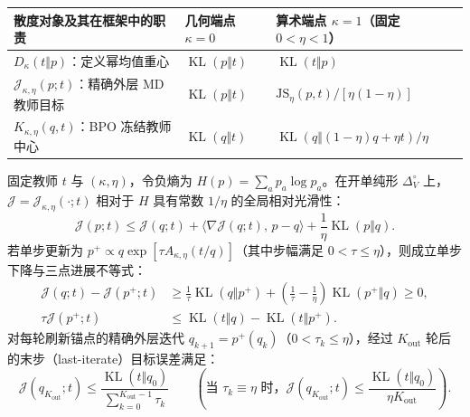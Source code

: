 \documentclass[lang=cn,scheme=chinese,openany]{elegantbook}
\newcommand{\KL}{\operatorname{KL}}
\begin{document}
\begin{center}
\small
\begin{tabular}{lll}
\toprule
散度对象及其在框架中的职责 & 几何端点 $\kappa=0$ & 算术端点 $\kappa=1$（固定 $0<\eta<1$）\\
\midrule
$D_\kappa(t\Vert p)$：定义幂均值重心 & $\KL(p\Vert t)$ & $\KL(t\Vert p)$\\
$\mathcal J_{\kappa,\eta}(p;t)$：精确外层 MD 教师目标 & $\KL(p\Vert t)$ & $\mathrm{JS}_\eta(p,t)/[\eta(1-\eta)]$\\
$K_{\kappa,\eta}(q,t)$：BPO 冻结教师中心 & $\KL(q\Vert t)$ & $\KL(q\Vert(1-\eta)q+\eta t)/\eta$\\
\bottomrule
\end{tabular}
\end{center}

\begin{theorem}
\label{thm:power-md-relative-smoothness}
固定教师 $t$ 与 $(\kappa,\eta)$，令负熵为 $H(p)=\sum_a p_a\log p_a$。在开单纯形 $\Delta_V^\circ$ 上，$\mathcal J=\mathcal J_{\kappa,\eta}(\cdot;t)$ 相对于 $H$ 具有常数 $1/\eta$ 的全局相对光滑性：
\begin{equation}
 \mathcal J(p;t)\le\mathcal J(q;t)+\bigl\langle\nabla\mathcal J(q;t),\,p-q\bigr\rangle
       +\frac1\eta\KL(p\Vert q).
 \label{eq:power-md-relative-smoothness}
\end{equation}
若单步更新为 $p^+\propto q\exp[\tau A_{\kappa,\eta}(t/q)]$（其中步幅满足 $0<\tau\le\eta$），则成立单步下降与三点进展不等式：
\begin{align}
 \mathcal J(q;t)-\mathcal J(p^+;t)
 &\ge\frac1\tau\KL(q\Vert p^+)
  +\left(\frac1\tau-\frac1\eta\right)\KL(p^+\Vert q)\ge 0,\\
 \tau\mathcal J(p^+;t)
 &\le\KL(t\Vert q)-\KL(t\Vert p^+).
 \label{eq:power-md-single-step-progress}
\end{align}
对每轮刷新锚点的精确外层迭代 $q_{k+1}=p^+(q_k)$（$0<\tau_k\le\eta$），经过 $K_{\mathrm{out}}$ 轮后的末步（last-iterate）目标误差满足：
\begin{equation}
 \mathcal J(q_{K_{\mathrm{out}}};t)\le
 \frac{\KL(t\Vert q_0)}{\sum_{k=0}^{K_{\mathrm{out}}-1}\tau_k}
 \qquad\left(\text{当 }\tau_k\equiv\eta\text{ 时，}\mathcal J(q_{K_{\mathrm{out}}};t)\le\frac{\KL(t\Vert q_0)}{\eta K_{\mathrm{out}}}\right).
 \label{eq:power-md-last-iterate-rate}
\end{equation}
\end{theorem}
\end{document}
